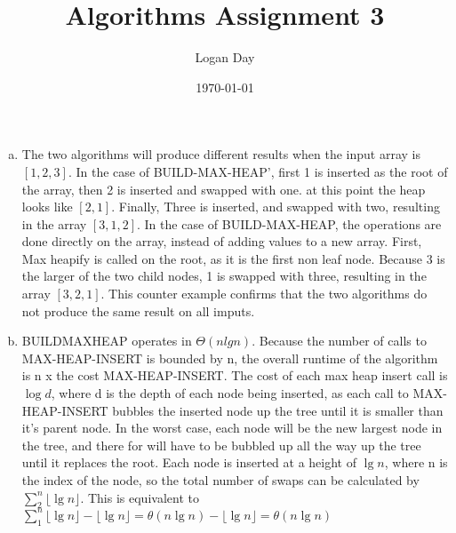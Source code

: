 \documentclass{article}
\title{Algorithms Assignment 3}
\author{Logan Day}
\date{\today}
\begin{document}
\maketitle
\section{}

\begin{enumerate}[a.]

    \item

        The two algorithms will produce different results when the input array
        is $[1, 2, 3]$. In the case of BUILD-MAX-HEAP', first 1 is inserted
        as the root of the array, then 2 is inserted and swapped with one. at
        this point the heap looks like $[2, 1]$. Finally, Three is inserted,
        and swapped with two, resulting in the array $[3, 1, 2]$. In the case
        of BUILD-MAX-HEAP, the operations are done directly on the array, instead
        of adding values to a new array. First, Max heapify is called on the
        root, as it is the first non leaf node. Because 3 is the larger of the
        two child nodes, 1 is swapped with three, resulting in the array $[3,
        2, 1]$. This counter example confirms that the two algorithms do not
        produce the same result on all imputs. 

    \item

        BUILDMAXHEAP operates in $\Theta(nlg{n})$. Because the number of
        calls to MAX-HEAP-INSERT is bounded by n, the overall runtime of the
        algorithm is n x the cost MAX-HEAP-INSERT. The cost of each max heap insert
        call is $\log{d}$, where d is the depth of each node being inserted, as
        each call to MAX-HEAP-INSERT bubbles the inserted node up the tree until
        it is smaller than it's parent node. In the worst case, each node will be
        the new largest node in the tree, and there for will have to be bubbled
        up all the way up the tree until it replaces the root. Each node is inserted
        at a height of $\lg{n}$, where n is the index of the node, so the total
        number of swaps can be calculated by $\sum_2^n{ \lfloor \lg{n} \rfloor }$. 
        This is equivalent to  $\sum_1^n{ \lfloor \lg{n} \rfloor } -  \lfloor \lg{n} \rfloor 
        = \theta(n\lg{n}) - \lfloor \lg{n} \rfloor = \theta(n\lg{n})$

\end{enumerate}
\end{document}

